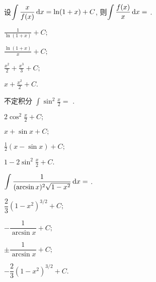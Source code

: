 \begin{problem} 设$\displaystyle \int \frac{x}{f(x)}\mathop{}\!\mathrm{d} x = \ln(1 + x) + C$,
则$\displaystyle \int \frac{f(x)}{x}\mathop{}\!\mathrm{d} x =$ .

\begin{abcd} 
\item $\displaystyle \frac{1}{\ln(1 + x)} + C; $

\item $\displaystyle \frac{\ln(1 + x)}{x} + C; $

\item $\displaystyle \frac{x^{2}}{2} + \frac{x^{3}}{3} + C; $

\item $\displaystyle x + \frac{x^{2}}{2} + C.$

\end{abcd}

\end{problem}           

\begin{problem} 不定积分 $\displaystyle \int \sin^2 {\frac{x}{2}} =$ .

\begin{abcd} 
\item $\displaystyle 2{\cos^{2}}\frac{x}{2} + C; $

\item $\displaystyle x + \sin x + C; $

\item $\displaystyle \frac{1}{2}(x - \sin x) + C; $

\item $\displaystyle {1 - 2}{\sin^{2}}\frac{x}{2} + C.$

\end{abcd}

\end{problem}           

\begin{problem} 
	$\displaystyle \int \frac{1}{(\arcsin x)^{2}\sqrt{1 - x^{2}}}\mathop{}\!\mathrm{d} x =$ .

\begin{abcd} 
	
\item $\dfrac{2}{3}\left( 1 - x^{2} \right)^{3/2} + C; $

\item $- \dfrac{1}{\arcsin x} + C; $

\item $\pm \dfrac{1}{\arcsin x} + C; $

\item $- \dfrac{2}{3}\left( 1 - x^{2} \right)^{3/2} + C.$

\end{abcd}

\end{problem}           

